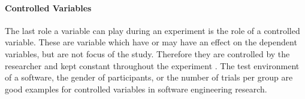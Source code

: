 \paragraph{Controlled Variables}

The last role a variable can play during an experiment is the role of a controlled variable. These are variable which have or may have an effect on the dependent variables, but are not focus of the study. Therefore they are controlled by the researcher and kept constant throughout the experiment \cite{BuddiesVariables}. The test environment of a software, the gender of participants, or the number of trials per group are good examples for controlled variables in software engineering research.
